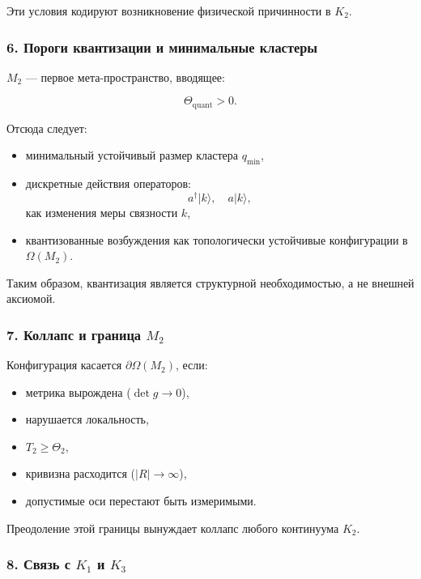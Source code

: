 Эти условия кодируют возникновение физической причинности в $K_2$.

\subsubsection*{6. Пороги квантизации и минимальные кластеры}

$M_2$ — первое мета-пространство, вводящее:

\[
\Theta_{\text{quant}} > 0.
\]

Отсюда следует:

\begin{itemize}
    \item минимальный устойчивый размер кластера $q_{\min}$,
    \item дискретные действия операторов:
    \[
    a^\dagger |k\rangle,\quad a |k\rangle,
    \]
    как изменения меры связности $k$,
    \item квантизованные возбуждения как топологически устойчивые
    конфигурации в $\Omega(M_2)$.
\end{itemize}

Таким образом, квантизация является структурной необходимостью,
а не внешней аксиомой.

\subsubsection*{7. Коллапс и граница \texorpdfstring{$M_2$}{M_2}}

Конфигурация касается $\partial\Omega(M_2)$, если:

\begin{itemize}
    \item метрика вырождена ($\det g \to 0$),
    \item нарушается локальность,
    \item $T_2 \ge \Theta_2$,
    \item кривизна расходится ($|R| \to \infty$),
    \item допустимые оси перестают быть измеримыми.
\end{itemize}

Преодоление этой границы вынуждает коллапс любого континуума $K_2$.

\subsubsection*{8. Связь с \texorpdfstring{$K_1$}{K_1} и \texorpdfstring{$K_3$}{K_3}}

